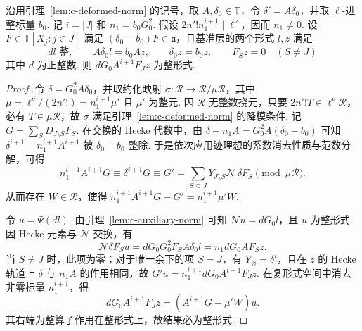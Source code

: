 \begin{lemma}[利用迹理想最高系数清除分母]
\label{lem:c-integral-top-coefficient}
\emitthmsource
沿用引理~\ref{lem:c-deformed-norm} 的记号，取 $A,\delta_0\in\mathbb T$，令 $\delta'=A\delta_0$，并取 $\ell$-进整标量 $b_0$. 记 $i=|J|$ 和 $n_1=b_0G_0^2$.
假设 $2n'! n_1^{i+1}\mid\ell^\nu$，因而 $n_1\ne0$.
设 $F\in\mathbb T[X_j:j\in J]$ 满足 $(\delta_0-b_0)F\in\mathfrak a$，且基准层的两个形式 $l,z$ 满足
\[
 d l\text{ 整},\qquad
 A\delta_0 l=b_0 A z,\qquad \delta_0 z=b_0 z,
 \qquad F_S z=0\quad(S\ne J)
\]
其中 $d$ 为正整数.
则 $dG_0 A^{i+1}F_J z$ 为整形式.
\end{lemma}
\begin{proof}
令 $\delta=G_0^2 A\delta_0$，并取约化映射 $\sigma:\mathcal R\to\mathcal R/\mu\mathcal R$，其中 $\mu=\ell^\nu/(2n'!)=n_1^{i+1}\mu'$ 且 $\mu'$ 为整元.
因 $\mathcal R$ 无整数挠元，只要 $2n'! T\in\ell^\nu\mathcal R$，必有 $T\in\mu\mathcal R$，故 $\sigma$ 满足引理~\ref{lem:c-deformed-norm} 的降模条件.
记 $G=\sum_S D_{J\setminus S}F_S$. 在交换的 Hecke 代数中，由 $\delta-n_1 A=G_0^2 A(\delta_0-b_0)$ 可知 $\delta^{i+1}-n_1^{i+1}A^{i+1}$ 被 $\delta_0-b_0$ 整除.
于是依次应用迹理想的系数消去性质与范数分解，可得
\[
 n_1^{i+1}A^{i+1}G
   \equiv \delta^{i+1}G
   \equiv G'=\sum_{S\subseteq J}Y_{J\setminus S}\mathcal N\,\delta F_S
       \pmod{\mu\mathcal R}.
\]
从而存在 $W\in\mathcal R$，使得 $n_1^{i+1}A^{i+1}G-G'=n_1^{i+1}\mu' W$.

令 $u=\Psi(d l)$. 由引理~\ref{lem:c-auxiliary-norm} 可知 $\mathcal N u=dG_0 l$，且 $u$ 为整形式.
因 Hecke 元素与 $\mathcal N$ 交换，有
\[
 \mathcal N\delta F_S u
  = dG_0G_0^2 F_S A\delta_0 l
  = n_1dG_0 A F_S z .
\]
当 $S\ne J$ 时，此项为零；对于唯一余下的项 $S=J$，有 $Y_\varnothing=\delta^i$，且在 $z$ 的 Hecke 轨道上 $\delta$ 与 $n_1 A$ 的作用相同，故 $G'u=n_1^{i+1}dG_0 A^{i+1}F_Jz$.
在复形式空间中消去非零标量 $n_1^{i+1}$，得
\[
 dG_0 A^{i+1}F_J z=(A^{i+1}G-\mu'W)u .
\]
其右端为整算子作用在整形式上，故结果必为整形式.
\end{proof}


